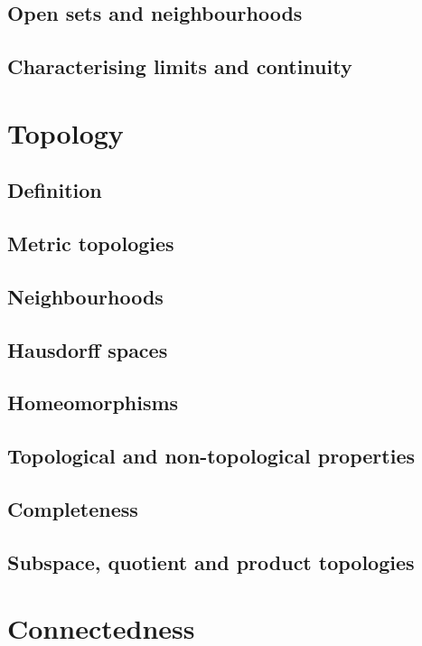 \documentclass[main.tex]{subfiles}
\begin{document}
	\subsection{Open sets and neighbourhoods}
	
	\subsection{Characterising limits and continuity}
	
	\section{Topology}
	\subsection{Definition}
	
	\subsection{Metric topologies}
	
	\subsection{Neighbourhoods}
	
	\subsection{Hausdorff spaces}
	
	\subsection{Homeomorphisms}
	
	\subsection{Topological and non-topological properties}
	
	\subsection{Completeness}
	
	\subsection{Subspace, quotient and product topologies}
	
	\section{Connectedness}
\end{document}
